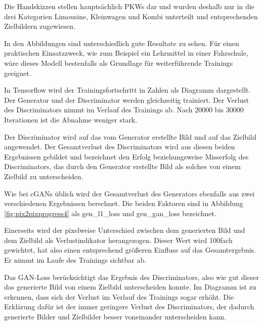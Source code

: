 Die Handskizzen stellen hauptsächlich PKWs dar und wurden deshalb nur in die drei Kategorien Limousine, Kleinwagen und Kombi unterteilt und entsprechenden Zielbildern zugewiesen.

In den Abbildungen sind unterschiedlich gute Resultate zu sehen. Für einen praktischen Einsatzzweck, wie zum Beispiel ein Lehrmittel in einer Fahrschule, wäre dieses Modell bestenfalls als Grundlage für weiterführende Trainings geeignet.

In Tensorflow wird der Trainingsfortschritt in Zahlen als Diagramm dargestellt. Der Generator und der Discriminator werden gleichzeitig trainiert. Der Verlust des Discriminators nimmt im Verlauf des Trainings ab. Nach $20000$ bis $30000$ Iterationen ist die Abnahme weniger stark.

Der Discriminator wird auf das vom Generator erstellte Bild und auf das Zielbild angewendet. Der Gesamtverlust des Discriminators wird aus diesen beiden Ergebnissen gebildet und bezeichnet den Erfolg beziehungsweise Misserfolg des Discriminators, das durch den Generator erstellte Bild als solches von einem Zielbild zu unterscheiden.

Wie bei cGANs üblich wird der Gesamtverlust des Generators ebenfalls aus zwei verschiedenen Ergebnissen berechnet. Die beiden Faktoren sind in Abbildung \ref{fig:pix2pixprogress4} als gen\_l1\_loss und gen\_gan\_loss bezeichnet.

Einerseits wird der pixelweise Unterschied zwischen dem generierten Bild und dem Zielbild als Verlustindikator herangezogen. Dieser Wert wird 100fach gewichtet, hat also einen entsprechend größeren Einfluss auf das Gesamtergebnis. Er nimmt im Laufe des Trainings sichtbar ab.

Das GAN-Loss berücksichtigt das Ergebnis des Discriminators, also wie gut dieser das generierte Bild von einem Zielbild unterscheiden konnte. Im Diagramm ist zu erkennen, dass sich der Verlust im Verlauf des Trainings sogar erhöht. Die Erklärung dafür ist der immer geringere Verlust des Discriminators, der dadurch generierte Bilder und Zielbilder besser voneinander unterscheiden kann.

